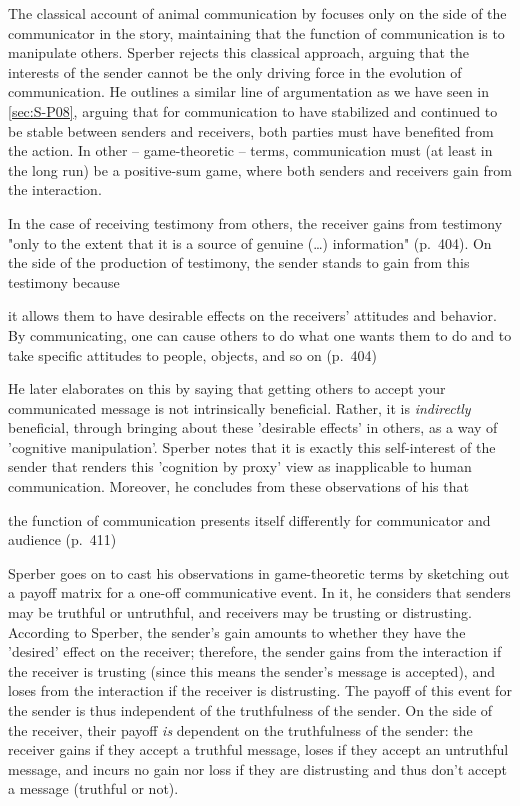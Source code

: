 The classical account of animal communication by \citet{DawkinsKrebs78} focuses only on the side of the communicator in the story, maintaining that the function of communication is to manipulate others. Sperber rejects this classical approach, arguing that the interests of the sender cannot be the only driving force in the evolution of communication.
He outlines a similar line of argumentation as we have seen in \cref{sec:S-P08},
arguing that for communication to have stabilized and continued to be stable between senders and receivers, both parties must have benefited from the action. In other -- game-theoretic -- terms, communication must (at least in the long run) be a positive-sum game, where both senders and receivers gain from the interaction.

In the case of receiving testimony from others, the receiver gains from testimony "only to the extent that it is a source of genuine (\ldots) information" (p.~404).
On the side of the production of testimony, the sender stands to gain from this testimony because
\begin{quoting}
    it allows them to have desirable effects on the receivers' attitudes and behavior. By communicating, one can cause others to do what one wants them to do and to take specific attitudes to people, objects, and so on
    \hfill (p.~404)
\end{quoting}
He later elaborates on this by saying that getting others to accept your communicated message is not intrinsically beneficial. Rather, it is \emph{indirectly} beneficial, through bringing about these 'desirable effects' in others, as a way of 'cognitive manipulation'.
Sperber notes that it is exactly this self-interest of the sender that renders this 'cognition by proxy' view as inapplicable to human communication.
Moreover, he concludes from these observations of his that
\begin{quoting}
    the function of communication presents itself differently for communicator and audience
    \hfill (p.~411)
\end{quoting}

Sperber goes on to cast his observations in game-theoretic terms by sketching out a payoff matrix for a one-off communicative event. In it, he considers that senders may be truthful or untruthful, and receivers may be trusting or distrusting. According to Sperber, the sender's gain amounts to whether they have the 'desired' effect on the receiver; therefore, the sender gains from the interaction if the receiver is trusting (since this means the sender's message is accepted), and loses from the interaction if the receiver is distrusting. The payoff of this event for the sender is thus independent of the truthfulness of the sender. On the side of the receiver, their payoff \emph{is} dependent on the truthfulness of the sender: the receiver gains if they accept a truthful message, loses if they accept an untruthful message, and incurs no gain nor loss if they are distrusting and thus don't accept a message (truthful or not).


